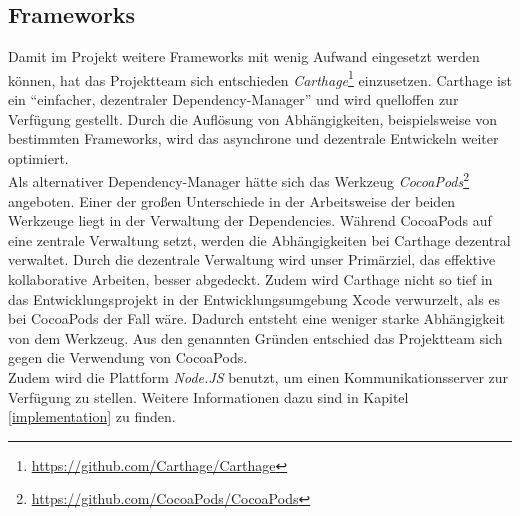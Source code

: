 \subsection{Frameworks}
Damit im Projekt weitere Frameworks mit wenig Aufwand eingesetzt werden können, hat das Projektteam sich entschieden \emph{Carthage}\footnote{\url{https://github.com/Carthage/Carthage}} einzusetzen. Carthage ist ein \enquote{einfacher, dezentraler Dependency-Manager} und wird quelloffen zur Verfügung gestellt. Durch die Auflösung von Abhängigkeiten, beispielsweise von bestimmten Frameworks, wird das asynchrone und dezentrale Entwickeln weiter optimiert. \\
Als alternativer Dependency-Manager hätte sich das Werkzeug \emph{CocoaPods}\footnote{\url{https://github.com/CocoaPods/CocoaPods}} angeboten. Einer der großen Unterschiede in der Arbeitsweise der beiden Werkzeuge liegt in der Verwaltung der Dependencies. Während CocoaPods auf eine zentrale Verwaltung setzt, werden die Abhängigkeiten bei Carthage dezentral verwaltet. Durch die dezentrale Verwaltung wird unser Primärziel, das effektive kollaborative Arbeiten, besser abgedeckt. Zudem wird Carthage nicht so tief in das Entwicklungsprojekt in der Entwicklungsumgebung Xcode verwurzelt, als es bei CocoaPods der Fall wäre. Dadurch entsteht eine weniger starke Abhängigkeit von dem Werkzeug. Aus den genannten Gründen entschied das Projektteam sich gegen die Verwendung von CocoaPods. \\
Zudem wird die Plattform \emph{Node.JS} benutzt, um einen Kommunikationsserver zur Verfügung zu stellen. Weitere Informationen dazu sind in Kapitel \ref{implementation} zu finden. 










